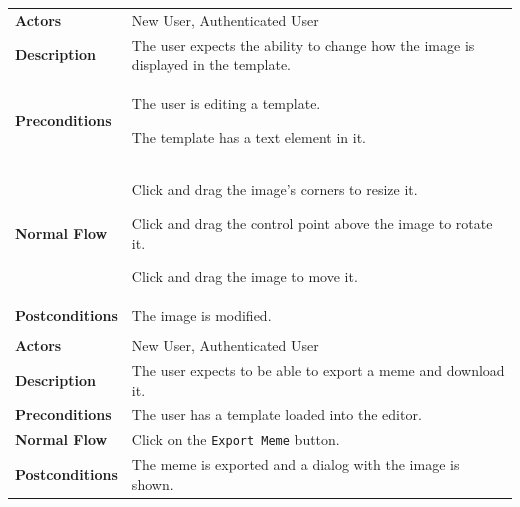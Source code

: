 \begin{longtable}{@{}>{\raggedright\arraybackslash}p{3cm} p{11cm}}
    \textbf{Actors}         & New User, Authenticated User
    \\

    \textbf{Description}    & The user expects the ability to change how the image is displayed in the template.
    \\

    \textbf{Preconditions}  & \begin{usecaseenum}
                                  \item The user is editing a template.
                                  \item The template has a text element in it.
                              \end{usecaseenum}
    \\

    \textbf{Normal Flow}    & \begin{usecaseenum}
                                  \item Click and drag the image's corners to resize it.
                                  \item Click and drag the control point above the image to rotate it.
                                  \item Click and drag the image to move it.
                              \end{usecaseenum}
    \\

    \textbf{Postconditions} & The image is modified.
    \\
    
    \hline
    \multicolumn{2}{c}{\textbf{Exporte a meme}}
    \\
    \hline

    \textbf{Actors}         &  New User, Authenticated User
    \\

    \textbf{Description}    & The user expects to be able to export a meme and download it.
    \\

    \textbf{Preconditions}  & The user has a template loaded into the editor.
    \\

    \textbf{Normal Flow}    & Click on the \texttt{Export Meme} button.
    \\

    \textbf{Postconditions} & The meme is exported and a dialog with the image is shown.
    \\


\end{longtable}
